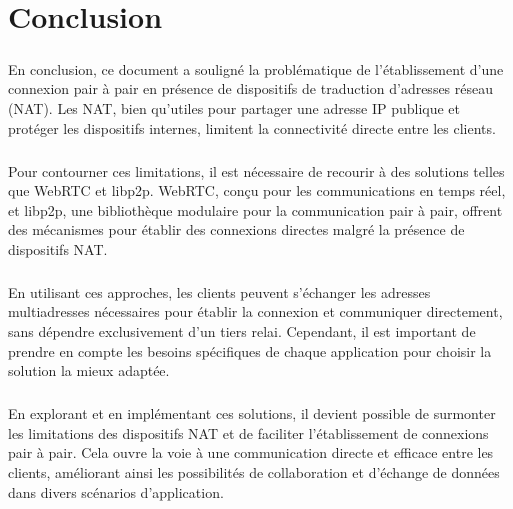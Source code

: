 \chapter{Conclusion}

\paragraph{}
En conclusion, ce document a souligné la problématique de l'établissement d'une connexion pair à pair en présence de dispositifs de traduction d'adresses réseau (NAT). Les NAT, bien qu'utiles pour partager une adresse IP publique et protéger 
les dispositifs internes, limitent la connectivité directe entre les clients.

\paragraph{}
Pour contourner ces limitations, il est nécessaire de recourir à des solutions telles que WebRTC et libp2p. WebRTC, conçu pour les communications en temps réel, et libp2p, une bibliothèque modulaire pour la communication pair à pair, 
offrent des mécanismes pour établir des connexions directes malgré la présence de dispositifs NAT.

\paragraph{}
En utilisant ces approches, les clients peuvent s'échanger les adresses multiadresses nécessaires pour établir la connexion et communiquer directement, sans dépendre exclusivement d'un tiers relai. Cependant, il est important de prendre
en compte les besoins spécifiques de chaque application pour choisir la solution la mieux adaptée.

\paragraph{}
En explorant et en implémentant ces solutions, il devient possible de surmonter les limitations des dispositifs NAT et de faciliter l'établissement de connexions pair à pair. Cela ouvre la voie à une communication directe et efficace entre les clients, 
améliorant ainsi les possibilités de collaboration et d'échange de données dans divers scénarios d'application.